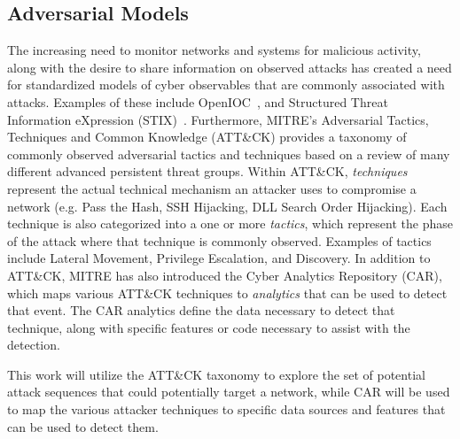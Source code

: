 \documentclass[journal]{IEEEtran}
\begin{document}



\cite{Collins:2008:LPN:1433006.1433025}


\subsection{Adversarial Models}
The increasing need to monitor networks and systems for malicious activity, along with the desire to share information on observed attacks has created a need for standardized models of cyber observables that are commonly associated with attacks. Examples of these include OpenIOC~\cite{openioc}, and Structured Threat Information eXpression (STIX)~\cite{stix}. Furthermore,  MITRE's Adversarial Tactics, Techniques and Common Knowledge (ATT\&CK) provides a taxonomy of commonly observed adversarial tactics and techniques based on a review of many different advanced persistent threat groups. Within ATT\&CK, {\it techniques} represent the actual technical mechanism an attacker uses to compromise a network (e.g. Pass the Hash, SSH Hijacking,	DLL Search Order Hijacking). Each technique is also categorized into a one or more {\it tactics}, which represent the phase of the attack where that technique is commonly observed. Examples of tactics include Lateral Movement, Privilege Escalation, and Discovery. In addition to ATT\&CK, MITRE has also introduced the Cyber Analytics Repository (CAR), which maps various ATT\&CK techniques to {\it analytics} that can be used to detect that event. The CAR analytics define the data necessary to detect that technique, along with specific features or code necessary to assist with the detection. 

This work will utilize the ATT\&CK taxonomy to explore the set of potential attack sequences that could potentially target a network, while CAR will be used to map the various attacker techniques to specific data sources and features that can be used to detect them. 
\end{document}
